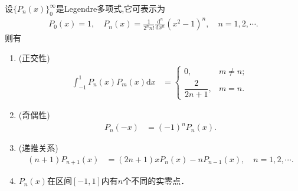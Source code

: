 \documentclass[../../main.tex]{subfiles}
\begin{document}
\begin{theorem}[Legendre多项式的性质]\label{theorem:Legendre多项式的性质}
设$\{P_n(x)\}_0^{\infty}$是Legendre多项式,它可表示为
\begin{align*}
P_0(x) = 1,\quad P_n(x) = \frac{1}{2^n n!} \frac{\mathrm{d}^n}{\mathrm{d}x^n}(x^2 - 1)^n,\quad n = 1,2,\cdots.
\end{align*}
则有
\begin{enumerate}
\item (正交性)
\begin{align}\label{eq:数值分析-3-2.7}
\int_{-1}^1 P_n(x)P_m(x)\mathrm{d}x &=
\begin{cases}
0, & m \neq n; \\
\dfrac{2}{2n+1}, & m = n.
\end{cases}
\end{align}

\item (奇偶性)
\begin{align}\label{eq:数值分析-3-2.8}
P_n(-x) &= (-1)^n P_n(x).
\end{align}

\item (递推关系)
\begin{align}\label{eq:数值分析-3-2.9}
(n+1)P_{n+1}(x) &= (2n+1)xP_n(x) - nP_{n-1}(x),\quad n = 1,2,\cdots.
\end{align}

\item $P_n(x)$在区间$[-1,1]$内有$n$个不同的实零点．
\end{enumerate}
\end{theorem}
\end{document}
